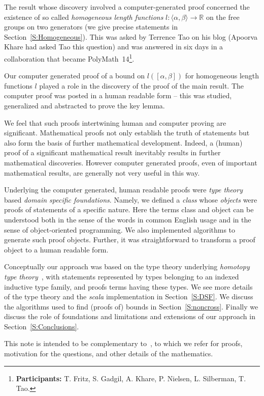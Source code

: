 \documentclass{amsart}
\theoremstyle{plain}
\theoremstyle{definition}
\theoremstyle{remark}
\newcommand{\R}{\mathbb{R}}
\newcommand{\F}{\langle \alpha, \beta \rangle}
\begin{document}
The result whose discovery involved a computer-generated proof concerned the existence of so called \emph{homogeneous length functions} $l: \F \to \R$ on the free groups on two generators (we give precise statements in Section~\ref{S:Homogeneous}). This was asked by Terrence Tao on his blog (Apoorva Khare had asked Tao this question) and was answered  in six days in a collaboration that became PolyMath~14\footnote{\textbf{Participants:} T. Fritz, S. Gadgil, A. Khare, P. Nielsen, L. Silberman, T. Tao.}.

Our computer generated proof of a bound on $l([\alpha, \beta])$ for homogeneous length functions $l$ played a role in the discovery of the proof of the main result. The computer proof was posted in a human readable form -- this was studied, generalized and abstracted to prove the key lemma.

We feel that such proofs intertwining human and computer proving are significant. Mathematical proofs not only establish the truth of statements but also form the basis of further mathematical development. Indeed, a (human) proof of a significant mathematical result inevitably results in further mathematical discoveries. However computer generated proofs, even of important mathematical results, are generally not very useful in this way.

Underlying the computer generated, human readable proofs were \emph{type theory} based \emph{domain specific foundations}. Namely, we defined a \emph{class} whose \emph{objects} were proofs of statements of a specific nature. Here the terms class and object can be understood both in the sense of the words in common English usage and in the sense of object-oriented programming. We also implemented algorithms to generate such proof objects. Further, it was straightforward to transform a proof object to a human readable form.

Conceptually our approach was based on the type theory underlying \emph{homotopy type theory}~\cite{hott}, with statements represented by types belonging to an indexed inductive type family, and proofs terms having these types.  We see more details of the type theory and the \emph{scala} implementation in Section~\ref{S:DSF}. We discuss the algorithms used to find (proofs of) bounds in Section~\ref{S:noncross}. Finally we discuss the role of foundations and limitations and extensions of our approach in Section~\ref{S:Conclusions}.

This note is intended to be complementary to~\cite{polymath}, to which we refer for proofs, motivation for the questions, and other details of the mathematics.
\end{document}
